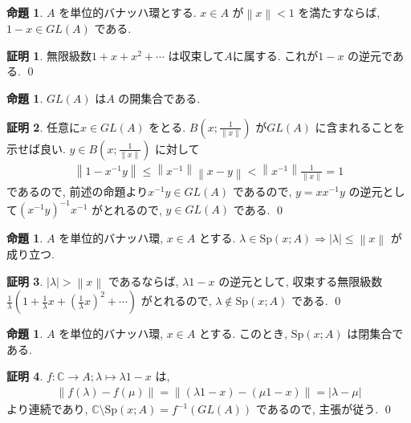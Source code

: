\documentclass[10pt, fleqn, label-section=none]{bxjsarticle}
\theoremstyle{definition}
\newtheorem{prop}[dfn]{命題}
\newtheorem*{pf*}{証明}
\newcommand{\abs}[1]{\left|#1\right|}
\newcommand{\norm}[1]{\left\|#1\right\|}
\newcommand{\naraba}{\Rightarrow}
\renewcommand{\;}{\, ; \,}
\begin{document}
\begin{prop}
$A$ を単位的バナッハ環とする. $x \in A$ が$\norm x < 1 $ を満たすならば, $1 - x \in GL(A)$ である. 
\end{prop}
\begin{pf*}
無限級数$1 + x + x^2 + \cdots $ は収束して$A$に属する. これが$1- x$ の逆元である. 
\qed
\end{pf*}

\begin{prop}
$GL(A)$ は$A$ の開集合である.
\end{prop}
\begin{pf*}
任意に$x \in GL(A)$ をとる. $B(x ; \frac{1}{\norm{x}})$ が$GL(A)$ に含まれることを示せば良い. $y \in B(x ; \frac{1}{\norm{x}})$ に対して
\begin{align*} \norm{1 - x^{-1} y }  \leq \norm{x^{-1}} \norm{x -y} < \norm{x^{-1}} \frac{1}{\norm{x}} =1 \end{align*}
であるので, 前述の命題より$x^{-1} y  \in GL(A) $ であるので, $y = x x^{-1} y$ の逆元として$(x^{-1} y) ^{-1} x^{-1}$ がとれるので, $y \in GL(A)$ である. 
\qed
\end{pf*}

\begin{prop} $A$ を単位的バナッハ環, $x \in A$ とする. 
$\lambda \in \textrm{Sp}(x ; A) \naraba \abs \lambda \leq \norm x$ が成り立つ.  
\end{prop}
\begin{pf*}
$\abs \lambda > \norm x$ であるならば, $\lambda 1 - x$ の逆元として, 収束する無限級数$\frac{1}{\lambda} (1 + \frac{1}{\lambda} x + (\frac{1}{\lambda} x)^2 + \cdots  )$ がとれるので, $\lambda \notin \textrm{Sp}(x ; A)$ である. 
\qed
\end{pf*}

\begin{prop} $A$ を単位的バナッハ環, $x \in A$ とする. このとき, 
$\textrm{Sp}(x ; A)$ は閉集合である. 
\end{prop}
\begin{pf*}
$f: \mathbb C \rightarrow A; \lambda \mapsto \lambda 1 - x$ は, 
\begin{align*} \norm{f(\lambda) - f(\mu)} = \norm{ (\lambda 1 - x ) - (\mu 1 - x) } = \abs{\lambda - \mu} \end{align*}
より連続であり, $\mathbb C \setminus \textrm{Sp}(x ; A)  = f^{-1} (GL(A))$ であるので, 主張が従う. 
\qed
\end{pf*}
\end{document}
